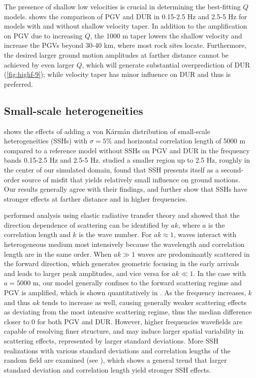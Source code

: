 The presence of shallow low velocities is crucial in determining the best-fitting $Q$ models.  shows the comparison of PGV and DUR in 0.15-2.5 Hz and 2.5-5 Hz for models with and without shallow velocity taper. In addition to the amplification on PGV due to increasing $Q$, the 1000 m taper lowers the shallow velocity and increase the PGVs beyond 30-40 km, where most rock sites locate. Furthermore, the desired larger ground motion amplitudes at farther distance cannot be achieved by even larger $Q$, which will generate substantial overprediction of DUR (\cref{fig:highf-9}); while velocity taper has minor influence on DUR and thus is preferred.

\subsection{Small-scale heterogeneities}
 shows the effects of adding a von K\'arm\'an distribution of small-scale heterogeneities (SSHs) with $\sigma = 5\%$ and horizontal correlation length of 5000 m compared to a reference model without SSHs on PGV and DUR in the frequency bands 0.15-2.5 Hz and 2.5-5 Hz. \citet{savranGroundMotionSimulation2019} studied a smaller region up to 2.5 Hz, roughly in the center of our simulated domain, found that SSH presents itself as a second-order source of misfit that yields relatively small influence on ground motions. Our results generally agree with their findings, and further show that SSHs have stronger effects at farther distance and in higher frequencies.

\citet{przybillaEstimationCrustalScattering2009} performed analysis using elastic radiative transfer theory and showed that the direction dependence of scattering can be identified by $ak$, where $a$ is the correlation length and $k$ is the wave number. For $ak \approx 1$, waves interact with heterogeneous medium most intensively because the wavelength and correlation length are in the same order. When $ak\gg 1$ waves are predominantly scattered in the forward direction, which generates geometric focusing in the early arrivals and leads to larger peak amplitudes, and vice versa for $ak \ll 1$. In the case with $a=5000$ m, our model generally confines to the forward scattering regime and PGV is amplified, which is shown quantitatively in . As the frequency increases, $k$ and thus $ak$ tends to increase as well, causing generally weaker scattering effects as deviating from the most intensive scattering regime, thus the median difference closer to 0 for both PGV and DUR. However, higher frequencies wavefields are capable of resolving finer structure, and may induce larger spatial variability in scattering effects, represented by larger standard deviations. More SSH realizations with various standard deviations and correlation lengths of the random field are examined (see ), which shows a general trend that larger standard deviation and correlation length yield stronger SSH effects.


